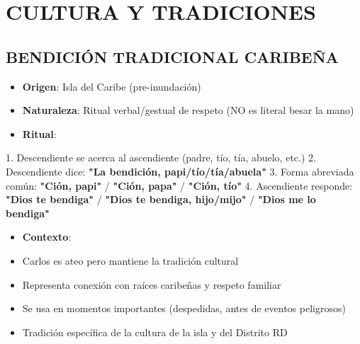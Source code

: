 \documentclass[11pt,a4paper]{report}
\begin{document}
\section{CULTURA Y TRADICIONES}

\subsection{BENDICIÓN TRADICIONAL CARIBEÑA}
\begin{itemize}
  \item \textbf{Origen}: Isla del Caribe (pre-inundación)
  \item \textbf{Naturaleza}: Ritual verbal/gestual de respeto (NO es literal besar la mano)
  \item \textbf{Ritual}:
\end{itemize}
  1. Descendiente se acerca al ascendiente (padre, tío, tía, abuelo, etc.)
  2. Descendiente dice: \textbf{"La bendición, papi/tío/tía/abuela"}
  3. Forma abreviada común: \textbf{"Ción, papi"} / \textbf{"Ción, papa"} / \textbf{"Ción, tío"}
  4. Ascendiente responde: \textbf{"Dios te bendiga"} / \textbf{"Dios te bendiga, hijo/mijo"} / \textbf{"Dios me lo bendiga"}
\begin{itemize}
  \item \textbf{Contexto}: 
  \item Carlos es ateo pero mantiene la tradición cultural
  \item Representa conexión con raíces caribeñas y respeto familiar
  \item Se usa en momentos importantes (despedidas, antes de eventos peligrosos)
  \item Tradición específica de la cultura de la isla y del Distrito RD

\end{itemize}
\end{document}
